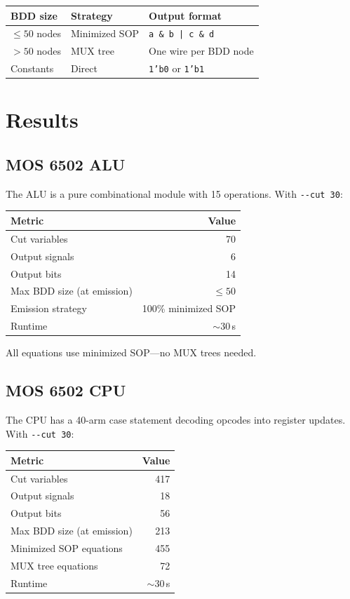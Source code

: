 \documentclass[11pt]{article}
\begin{document}
\begin{center}
\begin{tabular}{@{}lll@{}}
\toprule
BDD size & Strategy & Output format \\
\midrule
$\leq 50$ nodes & Minimized SOP & \texttt{a \& b | c \& d} \\
$> 50$ nodes & MUX tree & One wire per BDD node \\
\midrule
Constants & Direct & \texttt{1'b0} or \texttt{1'b1} \\
\bottomrule
\end{tabular}
\end{center}

\section{Results}

\subsection{MOS 6502 ALU}

The ALU is a pure combinational module with 15 operations.  With
\texttt{-{}-cut~30}:

\begin{center}
\begin{tabular}{@{}lr@{}}
\toprule
Metric & Value \\
\midrule
Cut variables & 70 \\
Output signals & 6 \\
Output bits & 14 \\
Max BDD size (at emission) & $\leq 50$ \\
Emission strategy & 100\% minimized SOP \\
Runtime & $\sim$30\,s \\
\bottomrule
\end{tabular}
\end{center}

All equations use minimized SOP---no MUX trees needed.

\subsection{MOS 6502 CPU}

The CPU has a 40-arm case statement decoding opcodes into register
updates.  With \texttt{-{}-cut~30}:

\begin{center}
\begin{tabular}{@{}lr@{}}
\toprule
Metric & Value \\
\midrule
Cut variables & 417 \\
Output signals & 18 \\
Output bits & 56 \\
Max BDD size (at emission) & 213 \\
Minimized SOP equations & 455 \\
MUX tree equations & 72 \\
Runtime & $\sim$30\,s \\
\bottomrule
\end{tabular}
\end{center}
\end{document}
